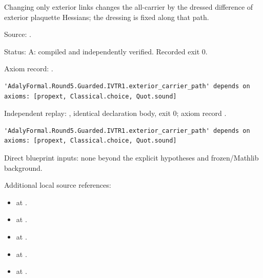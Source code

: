 \begin{theorem}[bp-048]
\label{bp-048}
\uses{}
\leanok
Changing only exterior links changes the all-carrier by the dressed difference of exterior plaquette Hessians; the dressing is fixed along that path.

\par Source: \texttt{}.
\par Status: A: compiled and independently verified. Recorded exit 0.
\par Axiom record: \texttt{}.
\begin{verbatim}
'AdalyFormal.Round5.Guarded.IVTR1.exterior_carrier_path' depends on axioms: [propext, Classical.choice, Quot.sound]
\end{verbatim}
\par Independent replay: \texttt{}, identical declaration body, exit 0; axiom record \texttt{}.
\begin{verbatim}
'AdalyFormal.Round5.Guarded.IVTR1.exterior_carrier_path' depends on axioms: [propext, Classical.choice, Quot.sound]
\end{verbatim}
\par Direct blueprint inputs: none beyond the explicit hypotheses and frozen/Mathlib background.
\par Additional local source references:
\begin{itemize}
\item \texttt{} at \texttt{}.
\item \texttt{} at \texttt{}.
\item \texttt{} at \texttt{}.
\item \texttt{} at \texttt{}.
\item \texttt{} at \texttt{}.
\end{itemize}

\end{theorem}
